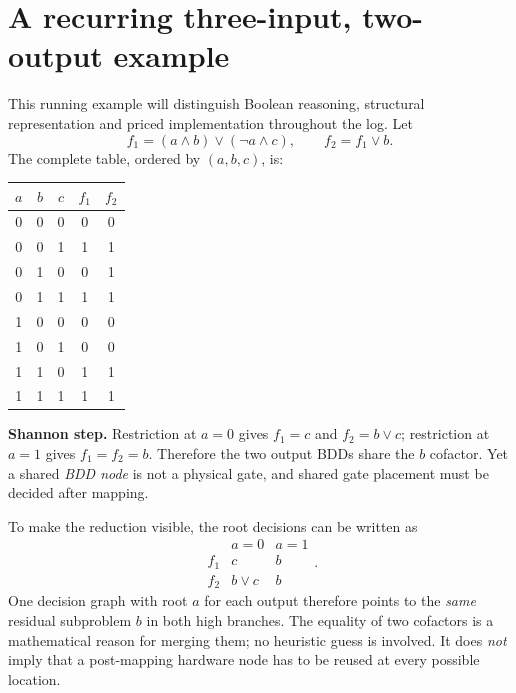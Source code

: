 \section{A recurring three-input, two-output example}
This running example will distinguish Boolean reasoning, structural representation and priced implementation throughout the log. Let
\[
 f_1=(a\land b)\lor(\neg a\land c),\qquad f_2=f_1\lor b.
\]
The complete table, ordered by $(a,b,c)$, is:
\begin{center}\small
\begin{tabular}{ccc|cc}\toprule
$a$&$b$&$c$&$f_1$&$f_2$\\\midrule
0&0&0&0&0\\0&0&1&1&1\\0&1&0&0&1\\0&1&1&1&1\\
1&0&0&0&0\\1&0&1&0&0\\1&1&0&1&1\\1&1&1&1&1\\\bottomrule
\end{tabular}
\end{center}
\textbf{Shannon step.} Restriction at $a=0$ gives $f_1=c$ and $f_2=b\lor c$; restriction at $a=1$ gives $f_1=f_2=b$. Therefore the two output BDDs share the $b$ cofactor. Yet a shared \emph{BDD node} is not a physical gate, and shared gate placement must be decided after mapping.

To make the reduction visible, the root decisions can be written as
\[
\begin{array}{c|cc}
 & a=0 & a=1\\\hline
f_1 & c & b\\
f_2 & b\lor c & b
\end{array}.
\]
One decision graph with root $a$ for each output therefore points to the \emph{same} residual subproblem $b$ in both high branches. The equality of two cofactors is a mathematical reason for merging them; no heuristic guess is involved. It does \emph{not} imply that a post-mapping hardware node has to be reused at every possible location.

